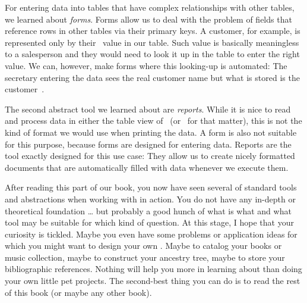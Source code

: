 For entering data into tables that have complex relationships with other tables, we learned about \emph{forms}.
Forms allow us to deal with the problem of fields that reference rows in other tables via their primary keys.
A customer, for example, is represented only by their ~value in our  table.
Such value is basically meaningless to a salesperson and they would need to look it up in the  table to enter the right value.
We can, however, make forms where this looking-up is automated:
The secretary entering the data sees the real customer name but what is stored is the customer~.

The second abstract tool we learned about are \emph{reports}.
While it is nice to read and process data in either the table view of \libreofficeBase\ (or \microsoftAccess\ for that matter), this is not the kind of format we would use when printing the data.
A form is also not suitable for this purpose, because forms are designed for entering data.
Reports are the tool exactly designed for this use case:
They allow us to create nicely formatted documents that are automatically filled with data whenever we execute them.

After reading this part of our book, you now have seen several of standard tools and abstractions when working with  in action.
You do not have any in-depth or theoretical foundation {\dots} but probably a good hunch of what is what and what tool may be suitable for which kind of question.
At this stage, I hope that your curiosity is tickled.
Maybe you even have some problems or application ideas for which you might want to design your own \db.
Maybe to catalog your books or music collection, maybe to construct your ancestry tree, maybe to store your bibliographic references.
Nothing will help you more in learning about  than doing your own little pet projects.
The second-best thing you can do is to read the rest of this book (or maybe any other book).%
%
\endhsection%
%
